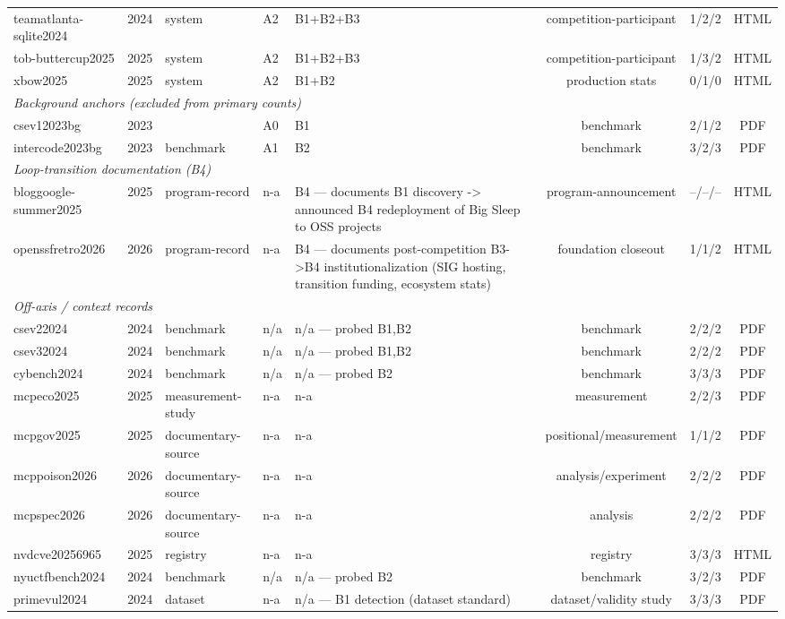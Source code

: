\begin{table}[t]
{\begin{tabular}{lllllccc}
teamatlanta-sqlite2024 & 2024 & system & A2 & B1+B2+B3 & competition-participant & 1/2/2 & HTML\\
tob-buttercup2025 & 2025 & system & A2 & B1+B2+B3 & competition-participant & 1/3/2 & HTML\\
xbow2025 & 2025 & system & A2 & B1+B2 & production stats & 0/1/0 & HTML\\
\midrule
\multicolumn{8}{l}{\emph{Background anchors (excluded from primary counts)}}\\
csev12023bg & 2023 &  & A0 & B1 & benchmark & 2/1/2 & PDF\\
intercode2023bg & 2023 & benchmark & A1 & B2 & benchmark & 3/2/3 & PDF\\
\midrule
\multicolumn{8}{l}{\emph{Loop-transition documentation (B4)}}\\
bloggoogle-summer2025 & 2025 & program-record & n-a & B4 — documents B1 discovery -> announced B4 redeployment of Big Sleep to OSS projects & program-announcement & --/--/-- & HTML\\
openssfretro2026 & 2026 & program-record & n-a & B4 — documents post-competition B3->B4 institutionalization (SIG hosting, transition funding, ecosystem stats) & foundation closeout & 1/1/2 & HTML\\
\midrule
\multicolumn{8}{l}{\emph{Off-axis / context records}}\\
csev22024 & 2024 & benchmark & n/a & n/a — probed {B1,B2} & benchmark & 2/2/2 & PDF\\
csev32024 & 2024 & benchmark & n/a & n/a — probed {B1,B2} & benchmark & 2/2/2 & PDF\\
cybench2024 & 2024 & benchmark & n/a & n/a — probed {B2} & benchmark & 3/3/3 & PDF\\
mcpeco2025 & 2025 & measurement-study & n-a & n-a & measurement & 2/2/3 & PDF\\
mcpgov2025 & 2025 & documentary-source & n-a & n-a & positional/measurement & 1/1/2 & PDF\\
mcppoison2026 & 2026 & documentary-source & n-a & n-a & analysis/experiment & 2/2/2 & PDF\\
mcpspec2026 & 2026 & documentary-source & n-a & n-a & analysis & 2/2/2 & PDF\\
nvdcve20256965 & 2025 & registry & n-a & n-a & registry & 3/3/3 & HTML\\
nyuctfbench2024 & 2024 & benchmark & n/a & n/a — probed {B2} & benchmark & 3/2/3 & PDF\\
primevul2024 & 2024 & dataset & n-a & n/a — B1 detection (dataset standard) & dataset/validity study & 3/3/3 & PDF\\

\end{tabular}}
\end{table}
